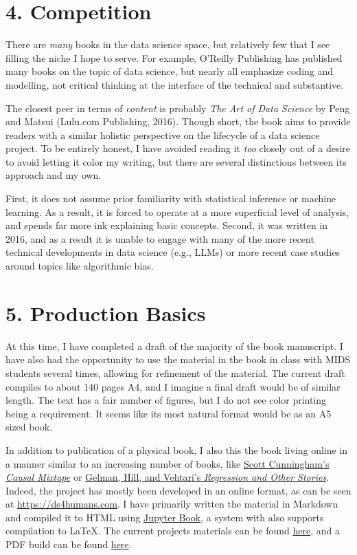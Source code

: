 \documentclass[12pt]{article}
\begin{document}
\section*{4. Competition}\label{competition}

There are \emph{many} books in the data science space, but relatively
few that I see filling the niche I hope to serve. For example, O'Reilly
Publishing has published many books on the topic of data science, but
nearly all emphasize coding and modelling, not critical thinking at the
interface of the technical and substantive.

The closest peer in terms of \emph{content} is probably \emph{The Art of
Data Science} by Peng and Matsui (Lulu.com Publishing, 2016). Though
short, the book aims to provide readers with a similar holistic
perspective on the lifecycle of a data science project. To be entirely
honest, I have avoided reading it \emph{too} closely out of a desire to
avoid letting it color my writing, but there are several distinctions
between its approach and my own.

First, it does not assume prior familiarity with statistical inference
or machine learning. As a result, it is forced to operate at a more
superficial level of analysis, and spends far more ink explaining basic
concepts. Second, it was written in 2016, and as a result it is unable
to engage with many of the more recent technical developments in data
science (e.g., LLMs) or more recent case studies around topics like
algorithmic bias.

\section*{5. Production Basics}\label{production-basics}

At this time, I have completed a draft of the majority of the book
manuscript. I have also had the opportunity to use the material in the
book in class with MIDS students several times, allowing for refinement
of the material. The current draft compiles to about 140 pages A4, and I
imagine a final draft would be of similar length. The text has a fair
number of figures, but I do not see color printing being a requirement.
It seems like its most natural format would be as an A5 sized book.

In addition to publication of a physical book, I also this the book
living online in a manner similar to an increasing number of books, like
\href{https://mixtape.scunning.com/}{Scott Cunningham's \emph{Causal
Mixtape}} or \href{https://avehtari.github.io/ROS-Examples/}{Gelman,
Hill, and Vehtari's \emph{Regression and Other Stories}}. Indeed, the
project has mostly been developed in an online format, as can be seen at
\url{https://ds4humans.com}. I have primarily written the material in
Markdown and compiled it to HTML using
\href{https://jupyterbook.org/en/stable/intro.html}{Jupyter Book}, a
system with also supports compilation to LaTeX. The current projects
materials can be found
\href{https://github.com/nickeubank/ds4humans}{here}, and a PDF build
can be found
\href{https://github.com/nickeubank/ds4humans/blob/main/_build/latex/ds4humans.pdf}{here}.
\end{document}
